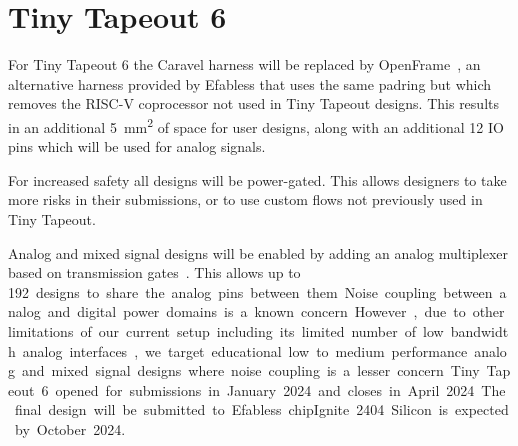 \section{Tiny Tapeout 6}
\label{sec:tinytapeout6}

For Tiny Tapeout 6 the Caravel harness will be replaced by OpenFrame~\cite{openframe}, an alternative harness provided by Efabless that uses the same padring but which removes the RISC-V coprocessor not used in Tiny Tapeout designs.
This results in an additional \qty{5}{\mm\squared} of space for user designs, along with an additional 12 IO pins which will be used for analog signals.

For increased safety all designs will be power-gated. This allows designers to take more risks in their submissions, or to use custom flows not previously used in Tiny Tapeout.

Analog and mixed signal designs will be enabled by adding an analog multiplexer based on transmission gates~\cite{transmissiongates}. 
This allows up to \qty{192} designs to share the analog pins between them.

Noise coupling between analog and digital power domains is a known concern. However, due to other limitations of our current setup including its limited number of low bandwidth analog interfaces, we target educational low to medium performance analog and mixed signal designs where noise coupling is a lesser concern.

Tiny Tapeout 6 opened for submissions in January 2024 and closes in April 2024. The final design will be submitted to Efabless chipIgnite 2404. Silicon is expected by October 2024.
